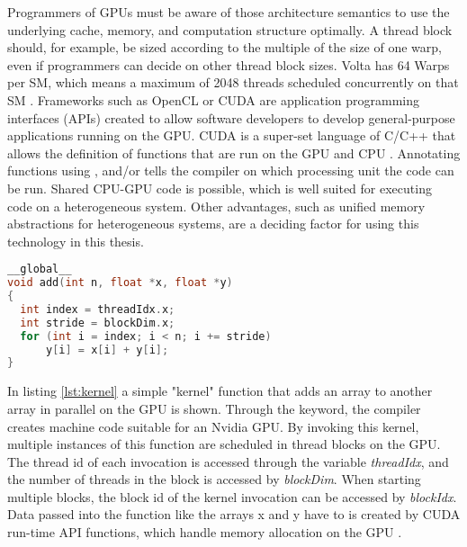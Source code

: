 Programmers of GPUs must be aware of those architecture semantics to use the underlying cache, memory, and computation structure optimally. A thread block should, for example, be sized according to the multiple of the size of one warp, even if programmers can decide on other thread block sizes. Volta has 64 Warps per SM, which means a maximum of 2048 threads scheduled concurrently on that SM \cite{NVIDIATESLAV1002017}.
Frameworks such as OpenCL or CUDA are application programming interfaces (APIs) created to allow software developers to develop general-purpose applications running on the GPU. CUDA is a super-set language of C/C++ that allows the definition of functions that are run on the GPU and CPU \cite{EasyIntroductionCUDA2012,nickollsScalableParallelProgramming2008,sosuthaHeterogeneousParallelComputing2015}. Annotating functions using \texttt{}, \texttt{} and/or \texttt{} tells the compiler on which processing unit the code can be run. Shared CPU-GPU code is possible, which is well suited for executing code on a heterogeneous system. Other advantages, such as unified memory abstractions for heterogeneous systems, are a deciding factor for using this technology in this thesis.

\begin{lstlisting}[language=C++, caption=Simple CUDA kernel example \cite{EasyIntroductionCUDA2012}, label=lst:kernel]
__global__
void add(int n, float *x, float *y)
{
  int index = threadIdx.x;
  int stride = blockDim.x;
  for (int i = index; i < n; i += stride)
      y[i] = x[i] + y[i];
}
\end{lstlisting}
In listing \ref{lst:kernel} a simple "kernel" function that adds an array to another array in parallel on the GPU is shown. Through the \texttt{} keyword, the compiler creates machine code suitable for an Nvidia GPU. By invoking this kernel, multiple instances of this function are scheduled in thread blocks on the GPU. The thread id of each invocation is accessed through the variable \emph{threadIdx}, and the number of threads in the block is accessed by \emph{blockDim}. When starting multiple blocks, the block id of the kernel invocation can be accessed by \emph{blockIdx}.
Data passed into the function like the arrays x and y have to is created by CUDA run-time API functions, which handle memory allocation on the GPU \cite{MemoryManagement}.

